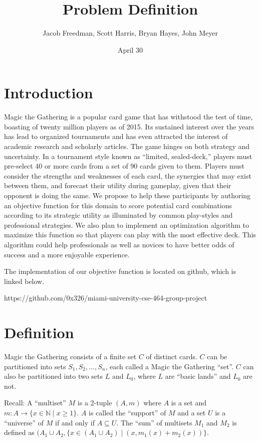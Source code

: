 \documentclass[12pt, letterpaper]{article}
\title{Problem Definition}
\date{April 30}
\author{Jacob Freedman, Scott Harris, Bryan Hayes, John Meyer}
\begin{document}
\maketitle

\section{Introduction}

Magic the Gathering is a popular card game that has withstood the test of time,
boasting of twenty million players as of 2015.
Its sustained interest over the years has lead to organized tournaments
and has even attracted the interest of academic research and scholarly articles.
The game hinges on both strategy and uncertainty.
In a tournament style known as \enquote{limited, sealed-deck,}
players must pre-select 40 or more cards from a set of 90 cards given to them.
Players must consider the strengths and weaknesses of each card,
the synergies that may exist between them,
and forecast their utility during gameplay,
given that their opponent is doing the same.
We propose to help these participants by authoring an objective function for this
domain to score potential card combinations according to its strategic utility
as illuminated by common play-styles and professional strategies.
We also plan to implement an optimization algorithm to maximize this function
so that players can play with the most effective deck.
This algorithm could help professionals as well as novices to have better odds of success
and a more enjoyable experience. 

The implementation of our objective function is located on github, which is linked below.

https://github.com/0x326/miami-university-cse-464-group-project

\section{Definition}

Magic the Gathering consists of a finite set $ C $ of distinct cards.
$ C $ can be partitioned into sets $ S_1, S_2, ..., S_n $, each called a Magic the Gathering \enquote{set}.
$ C $ can also be partitioned into two sets $ L $ and $ L_0 $, where $ L $ are \enquote{basic lands} and $ L_0 $ are not.

Recall: A \enquote{multiset} $ M $ is a 2-tuple $ (A, m) $
where $ A $ is a set and $ m: A \rightarrow \{x \in \mathbb{N} \mid x \ge 1 \} $.
$ A $ is called the \enquote{support} of $ M $ and
a set $ U $ is a \enquote{universe} of $ M $ if and only if $ A \subseteq U $.
The \enquote{sum} of multisets $ M_1 $ and $ M_2 $ is defined as
$ (A_1 \cup A_2, \{ x \in (A_1 \cup A_2) \mid (x, m_1(x) + m_2(x)) \} $.
\end{document}
